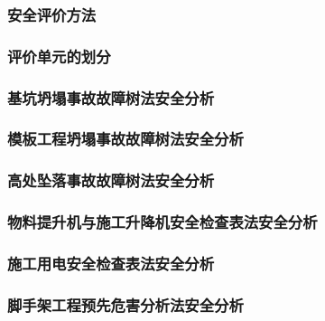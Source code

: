 \subsubsection{安全评价方法}
\subsubsection{评价单元的划分}
\subsubsection{基坑坍塌事故故障树法安全分析}
\subsubsection{模板工程坍塌事故故障树法安全分析}
\subsubsection{高处坠落事故故障树法安全分析}
\subsubsection{物料提升机与施工升降机安全检查表法安全分析}
\subsubsection{施工用电安全检查表法安全分析}
\subsubsection{脚手架工程预先危害分析法安全分析}